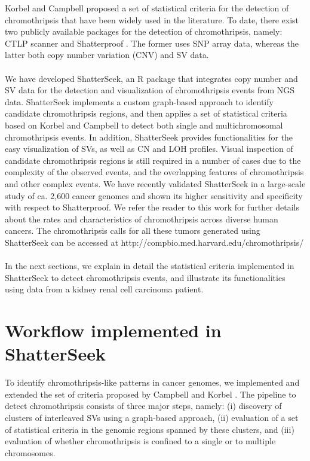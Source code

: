 \documentclass[twoside,a4wide,11pt]{article}\usepackage[]{graphicx}\usepackage[]{color}
\begin{document}
Korbel and Campbell \cite{Korbel2013} proposed a set of statistical criteria for the detection of chromothripsis that have been widely used in the literature. 
To date, there exist two publicly available packages for the detection of chromothripsis, namely: 
CTLP scanner \cite{Cai2014,Yang2016} and Shatterproof \cite{Govind2014}.
The former uses SNP array data, whereas the latter both copy number variation (CNV) and SV data.\\
\\
We have developed ShatterSeek, an R package that integrates copy number and SV data for the detection and 
visualization of chromothripsis events from NGS data.
ShatterSeek implements a custom graph-based approach to identify candidate chromothripsis regions, 
and then applies a set of statistical criteria based on Korbel and Campbell \cite{Korbel2013}
to detect both single and multichromosomal chromothripsis events.
In addition, ShatterSeek provides functionalities for the easy visualization of SVs, 
as well as CN and LOH profiles.
Visual inspection of candidate chromothripsis regions is still required in a number of cases due to the complexity of the observed events, and the overlapping features of chromothripsis and other complex events.
We have recently validated ShatterSeek in a large-scale
study of ca. 2,600 cancer genomes and
shown its higher sensitivity and specificity with respect to Shatterproof.
We refer the reader to this work for further details about the rates and characteristics of chromothripsis across diverse human cancers.
The chromothripsis calls for all these tumors generated using ShatterSeek can be accessed at 
http://compbio.med.harvard.edu/chromothripsis/ \\
\\
In the next sections, we explain in detail the statistical criteria implemented in ShatterSeek to detect
chromothripsis events,
and illustrate its functionalities using data from a kidney renal cell carcinoma patient.

\section{Workflow implemented in ShatterSeek}
To identify chromothripsis-like patterns in cancer genomes, we implemented and extended 
the set of  criteria proposed by Campbell and Korbel \cite{Korbel2013}. 
The pipeline to detect chromothripsis consists of three major steps, namely:
(i) discovery of clusters of interleaved SVs using a graph-based approach,
(ii) evaluation of a set of statistical criteria in the genomic regions spanned by these clusters,
and (iii) evaluation of whether chromothripsis is confined to a single or to multiple chromosomes.\\
\\
\end{document}
